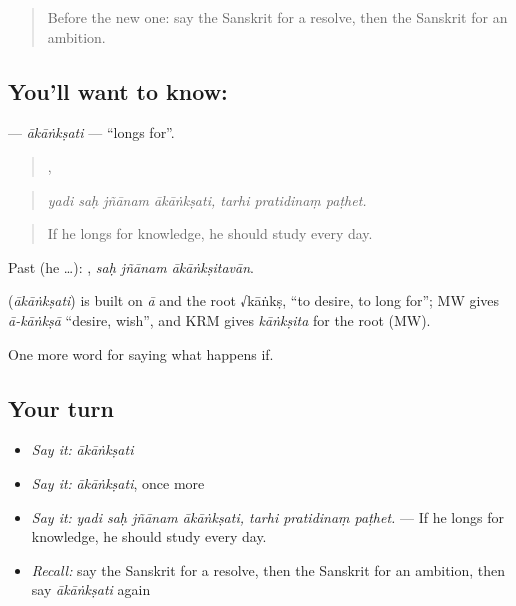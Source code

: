 \label{lesson:SA-C383-akanksati}



\begin{quote}
Before the new one: say the Sanskrit for a resolve, then the Sanskrit for an ambition.
\end{quote}

\subsection*{You'll want to know: }
\textbf{} — \emph{ākāṅkṣati} — \textquotedblleft{}longs for\textquotedblright{}.

\begin{quote}
   ,   
\end{quote}

\begin{quote}
\emph{yadi saḥ jñānam ākāṅkṣati, tarhi pratidinaṃ paṭhet.}
\end{quote}

\begin{quote}
If he longs for knowledge, he should study every day.
\end{quote}

Past (he …):   , \emph{saḥ jñānam ākāṅkṣitavān}.

\begin{cousinweb}
\textbf{} (\emph{ākāṅkṣati}) is built on \emph{ā} and the root √kāṅkṣ, \textquotedblleft{}to desire, to long for\textquotedblright{}; MW gives \emph{ā-kāṅkṣā} \textquotedblleft{}desire, wish\textquotedblright{}, and KRM gives \emph{kāṅkṣita} for the root (MW).
\end{cousinweb}

\begin{grammarlens}[title={What you've built}]
One more word for saying what happens if.
\end{grammarlens}

\subsection*{Your turn}
\begin{itemize}
\raggedright
  \item \emph{Say it:} \emph{ākāṅkṣati}
  \item \emph{Say it:} \emph{ākāṅkṣati}, once more
  \item \emph{Say it:} \emph{yadi saḥ jñānam ākāṅkṣati, tarhi pratidinaṃ paṭhet.} — If he longs for knowledge, he should study every day.
  \item \emph{Recall:} say the Sanskrit for a resolve, then the Sanskrit for an ambition, then say \emph{ākāṅkṣati} again
\end{itemize}

